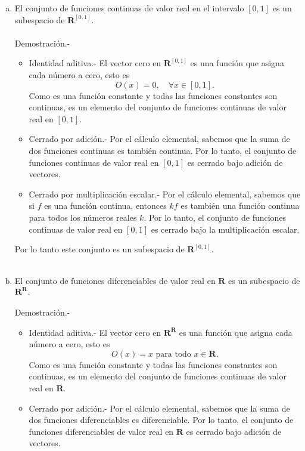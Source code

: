 \begin{enumerate}[\bfseries 1.]
\begin{enumerate}[(a)]
\begin{itemize}
		\end{itemize}

	    \item El conjunto de funciones continuas de valor real en el intervalo $[0,1]$ es un subespacio de $\textbf{R}^{[0,1]}$.\\\\
		Demostración.-\; 
		\begin{itemize}
		    \item Identidad aditiva.-\; El vector cero en $\textbf{R}^{[0,1]}$ es una función que asigna cada número a cero, esto es
			$$O(x)=0,\quad \forall x \in [0,1].$$
			Como es una función constante y todas las funciones constantes son continuas, es un elemento del conjunto de funciones continuas de valor real en $[0,1]$.

		    \item Cerrado por adición.-\; Por el cálculo elemental, sabemos que la suma de dos funciones continuas es también continua. Por lo tanto, el conjunto de funciones continuas de valor real en $[0,1]$ es cerrado bajo adición de vectores.

		    \item Cerrado por multiplicación escalar.-\; Por el cálculo elemental, sabemos que si $f$ es una función continua, entonces $kf$ es también una función continua para todos los números reales $k$. Por lo tanto, el conjunto de funciones continuas de valor real en $[0,1]$ es cerrado bajo la multiplicación escalar.
		\end{itemize}
		Por lo tanto este conjunto es un subespacio de $\textbf{R}^{[0,1]}$.\\\\

	    \item El conjunto de funciones diferenciables de valor real en $\textbf{R}$ es un subespacio de $\textbf{R}^{\textbf{R}}.$\\\\
		Demostración.-\; 
		\begin{itemize}
		    \item Identidad aditiva.-\; El vector cero en $\textbf{R}^{\textbf{R}}$ es una función que asigna cada número a cero, esto es
		    $$O(x)=x\mbox{ para todo }x\in \textbf{R}.$$
		    Como es una función constante y todas las funciones constantes son continuas, es un elemento del conjunto de funciones continuas de valor real en $\textbf{R}$.

		    \item Cerrado por adición.-\; Por el cálculo elemental, sabemos que la suma de dos funciones diferenciables es diferenciable. Por lo tanto, el conjunto de funciones diferenciables de valor real en $\textbf{R}$ es cerrado bajo adición de vectores.


\end{itemize}
\end{enumerate}
\end{enumerate}
